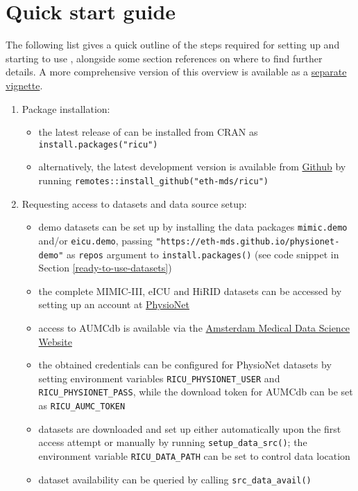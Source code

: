 \documentclass[
  notitle]{jss}
\begin{document}
\hypertarget{quick-start-guide}{%
\section{Quick start guide}\label{quick-start-guide}}

The following list gives a quick outline of the steps required for
setting up and starting to use , alongside some section
references on where to find further details. A more comprehensive
version of this overview is available as a
\href{https://CRAN.R-project.org/package=ricu/vignettes/ricu.html}{separate
vignette}.

\begin{enumerate}
\def\labelenumi{\arabic{enumi}.}
\item
  Package installation:

  \begin{itemize}
  \item
    the latest release of  can be installed from CRAN as
    \texttt{install.packages("ricu")}
  \item
    alternatively, the latest development version is available from
    \href{https://github.com/eth-mds/ricu}{Github} by running
    \texttt{remotes::install\_github("eth-mds/ricu")}
  \end{itemize}
\item
  Requesting access to datasets and data source setup:

  \begin{itemize}
  \item
    demo datasets can be set up by installing the data packages
    \texttt{mimic.demo} and/or \texttt{eicu.demo}, passing
    \texttt{"https://eth-mds.github.io/physionet-demo"} as
    \texttt{repos} argument to \texttt{install.packages()} (see code
    snippet in Section \ref{ready-to-use-datasets})
  \item
    the complete MIMIC-III, eICU and HiRID datasets can be accessed by
    setting up an account at
    \href{https://physionet.org/register}{PhysioNet}
  \item
    access to AUMCdb is available via the
    \href{https://amsterdammedicaldatascience.nl/\#amsterdamumcdb}{Amsterdam
    Medical Data Science Website}
  \item
    the obtained credentials can be configured for PhysioNet datasets by
    setting environment variables \texttt{RICU\_PHYSIONET\_USER} and
    \texttt{RICU\_PHYSIONET\_PASS}, while the download token for AUMCdb
    can be set as \texttt{RICU\_AUMC\_TOKEN}
  \item
    datasets are downloaded and set up either automatically upon the
    first access attempt or manually by running
    \texttt{setup\_data\_src()}; the environment variable
    \texttt{RICU\_DATA\_PATH} can be set to control data location
  \item
    dataset availability can be queried by calling
    \texttt{src\_data\_avail()}
  \end{itemize}


\end{enumerate}
\end{document}
